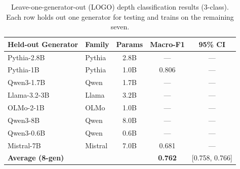 \begin{table}[t]
\centering
\small
\caption{Leave-one-generator-out (LOGO) depth classification results (3-class).
Each row holds out one generator for testing and trains on the remaining seven.}
\label{tab:logo-results}
\begin{tabular}{llccc}
\toprule
\textbf{Held-out Generator} & \textbf{Family} & \textbf{Params} & \textbf{Macro-F1} & \textbf{95\% CI} \\
\midrule
Pythia-2.8B   & Pythia  & 2.8B & ---   & --- \\
Pythia-1B     & Pythia  & 1.0B & 0.806 & --- \\
Qwen3-1.7B   & Qwen    & 1.7B & ---   & --- \\
Llama-3.2-3B & Llama   & 3.2B & ---   & --- \\
OLMo-2-1B    & OLMo    & 1.0B & ---   & --- \\
Qwen3-8B     & Qwen    & 8.0B & ---   & --- \\
Qwen3-0.6B   & Qwen    & 0.6B & ---   & --- \\
Mistral-7B   & Mistral & 7.0B & 0.681 & --- \\
\midrule
\textbf{Average (8-gen)} & & & \textbf{0.762} & [0.758, 0.766] \\
\bottomrule
\end{tabular}
\end{table}
